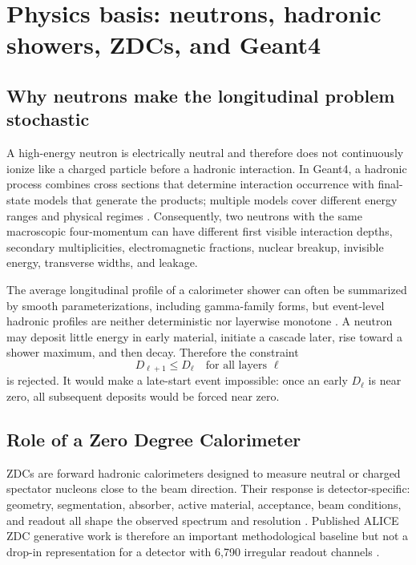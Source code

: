 \documentclass[11pt]{article}
\theoremstyle{definition}
\theoremstyle{remark}
\begin{document}
\section{Physics basis: neutrons, hadronic showers, ZDCs, and Geant4}

\subsection{Why neutrons make the longitudinal problem stochastic}
A high-energy neutron is electrically neutral and therefore does not continuously ionize like a charged particle before a hadronic interaction. In Geant4, a hadronic process combines cross sections that determine interaction occurrence with final-state models that generate the products; multiple models cover different energy ranges and physical regimes \citep{geant4_hadronic_manual}. Consequently, two neutrons with the same macroscopic four-momentum can have different first visible interaction depths, secondary multiplicities, electromagnetic fractions, nuclear breakup, invisible energy, transverse widths, and leakage.

The average longitudinal profile of a calorimeter shower can often be summarized by smooth parameterizations, including gamma-family forms, but event-level hadronic profiles are neither deterministic nor layerwise monotone \citep{hadronic_profile,gflash}. A neutron may deposit little energy in early material, initiate a cascade later, rise toward a shower maximum, and then decay. Therefore the constraint
\begin{equation}
  D_{\ell+1}\le D_\ell \quad \text{for all layers }\ell
\end{equation}
is rejected. It would make a late-start event impossible: once an early $D_\ell$ is near zero, all subsequent deposits would be forced near zero.

\subsection{Role of a Zero Degree Calorimeter}
ZDCs are forward hadronic calorimeters designed to measure neutral or charged spectator nucleons close to the beam direction. Their response is detector-specific: geometry, segmentation, absorber, active material, acceptance, beam conditions, and readout all shape the observed spectrum and resolution \citep{alice_zdc_tdr,zdc_multinucleon}. Published ALICE ZDC generative work is therefore an important methodological baseline but not a drop-in representation for a detector with 6,790 irregular readout channels \citep{zdcmachinelearning,zdcdiffusion,fasterzdc,expertsim,zdc_iaf}.
\end{document}
